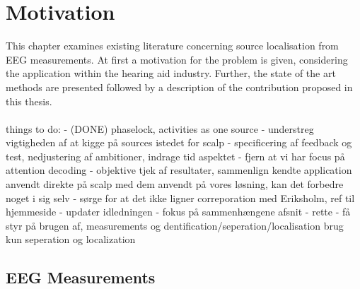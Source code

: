 \chapter{Motivation}\label{ch:motivation}
This chapter examines existing literature concerning source localisation from EEG measurements. At first a motivation for the problem is given, considering the application within the hearing aid industry. Further, the state of the art methods are presented followed by a description of the contribution proposed in this thesis. \\
\\
things to do: 
- (DONE) phaselock, activities as one source
- understreg vigtigheden af at kigge på sources istedet for scalp
- specificering af feedback og test, nedjustering af ambitioner, indrage tid aspektet
- fjern at vi har focus på attention decoding 
- objektive tjek af resultater, sammenlign kendte application anvendt direkte på scalp med dem anvendt på vores løsning, kan det forbedre noget i sig selv 
- sørge for at det ikke ligner correporation med Eriksholm, ref til hjemmeside 
- updater idledningen
- fokus på sammenhængene afsnit 
- rette 
- få styr på brugen af, measurements og dentification/seperation/localisation
brug kun seperation og localization  

\section{EEG Measurements}

